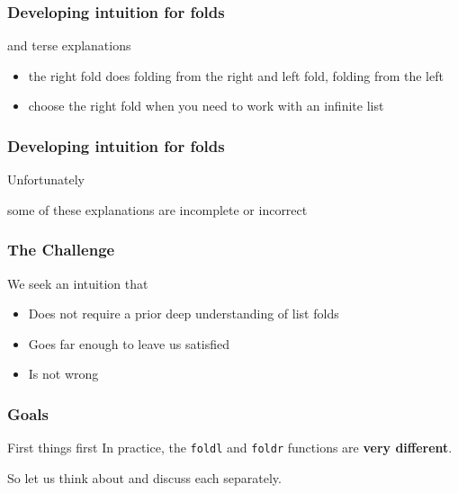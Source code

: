 \begin{frame}
\frametitle{Developing intuition for folds}
\begin{block}{and terse explanations}
\begin{itemize}
\item<1-> the right fold does folding from the right and left fold, folding from the left
\item<2-> choose the right fold when you need to work with an infinite list 
\end{itemize}
\end{block}
\end{frame}

\begin{frame}[fragile]
\frametitle{Developing intuition for folds}
\begin{block}{Unfortunately}
\begin{center}
some of these explanations are incomplete or incorrect
\end{center}
\end{block}
\end{frame}

\begin{frame}
\frametitle{The Challenge}
\begin{block}{We seek an intuition that}
\begin{itemize}
\item Does not require a prior deep understanding of list folds
\item Goes far enough to leave us satisfied
\item Is not wrong
\end{itemize}
\end{block}
\end{frame}

\begin{frame}
\frametitle{Goals}
\begin{block}{First things first}
\center
In practice, the \lstinline[basicstyle=\ttfamily]$foldl$ and \lstinline[basicstyle=\ttfamily]$foldr$ functions are \textbf{very different}.
\end{block}
So let us think about and discuss each separately.
\end{frame}

